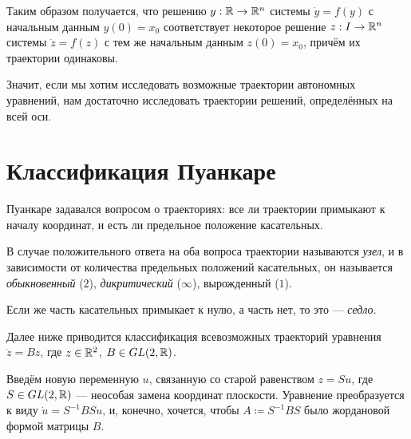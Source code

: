 \documentclass[a4paper]{report}
\begin{document}
    Таким образом получается, что решению $y: \mathbb{R} \rightarrow \mathbb{R}^n$ системы $\dot{y} = f(y)$ с начальным данным $y(0) = x_0$ соответствует некоторое решение $z: I \rightarrow \mathbb{R}^n$ системы $\dot{z} = f(z)$ с тем же начальным данным $z(0) = x_0$, причём их траектории одинаковы.

    Значит, если мы хотим исследовать возможные траектории автономных уравнений, нам достаточно исследовать траектории решений, определённых на всей оси.


    \section{Классификация Пуанкаре}
    Пуанкаре задавался вопросом о траекториях: все ли траектории примыкают к началу координат, и есть ли предельное положение касательных.

    В случае положительного ответа на оба вопроса траектории называются \emph{узел}, и в зависимости от количества предельных положений касательных, он называется \emph{обыкновенный} ($2$), \emph{дикритический} ($\infty$), вырожденный ($1$).

    Если же часть касательных примыкает к нулю, а часть нет, то это --- \emph{седло}.

    Далее ниже приводится классификация всевозможных траекторий уравнения $\dot{z} = Bz$, где $z \in \mathbb{R}^2$, $B \in GL(2, \mathbb{R})$.

    Введём новую переменную $u$, связанную со старой равенством $z = Su$, где $S \in GL(2, \mathbb{R})$ --- неособая замена координат плоскости.
    Уравнение преобразуется к виду $\dot{u} = S^{-1}BS u$, и, конечно, хочется, чтобы $A \coloneqq S^{-1}BS$ было жордановой формой матрицы $B$.
\end{document}
